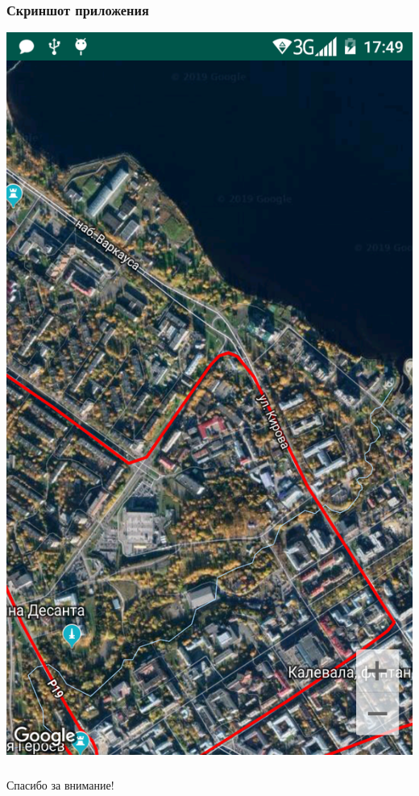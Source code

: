 \documentclass[hyperref={unicode}]{beamer}
\begin{document}
\begin{frame}
\frametitle{Скриншот приложения}
\begin{center}
	\includegraphics[height=0.8\textheight]{images/Screenshot.png}
\end{center}

\end{frame}

\begin{frame}
  \frametitle{}
  
{\Large\mbox{}\hfil Спасибо за внимание!}
  
\end{frame}
\end{document}

